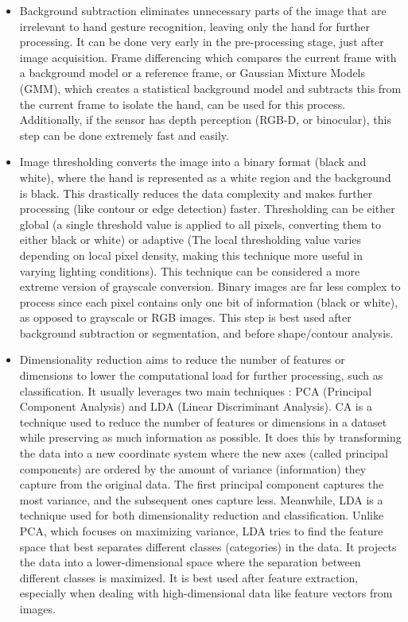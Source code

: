 \documentclass[12pt]{article}
\begin{document}
\begin{itemize}
  \item Background subtraction eliminates unnecessary parts of the image that are irrelevant to hand gesture recognition, leaving only the hand for further processing. It can be done very early in the pre-processing stage, just after image acquisition. Frame differencing which compares the current frame with a background model or a reference frame, or Gaussian Mixture Models (GMM), which creates a statistical background model and subtracts this from the current frame to isolate the hand, can be used for this process. Additionally, if the sensor has depth perception (RGB-D, or binocular), this step can be done extremely fast and easily.
  \item Image thresholding converts the image into a binary format (black and white), where the hand is represented as a white region and the background is black. This drastically reduces the data complexity and makes further processing (like contour or edge detection) faster. Thresholding can be either global (a single threshold value is applied to all pixels, converting them to either black or white) or adaptive (The local thresholding value varies depending on local pixel density, making this technique more useful in varying lighting conditions). This technique can be considered a more extreme version of grayscale conversion. Binary images are far less complex to process since each pixel contains only one bit of information (black or white), as opposed to grayscale or RGB images. This step is best used after background subtraction or segmentation, and before shape/contour analysis.
  \item Dimensionality reduction aims to reduce the number of features or dimensions to lower the computational load for further processing, such as classification. It usually leverages two main techniques : PCA (Principal Component Analysis) and LDA (Linear Discriminant Analysis). CA is a technique used to reduce the number of features or dimensions in a dataset while preserving as much information as possible. It does this by transforming the data into a new coordinate system where the new axes (called principal components) are ordered by the amount of variance (information) they capture from the original data. The first principal component captures the most variance, and the subsequent ones capture less. Meanwhile, LDA is a technique used for both dimensionality reduction and classification. Unlike PCA, which focuses on maximizing variance, LDA tries to find the feature space that best separates different classes (categories) in the data. It projects the data into a lower-dimensional space where the separation between different classes is maximized. It is best used after feature extraction, especially when dealing with high-dimensional data like feature vectors from images.

\end{itemize}
\end{document}
